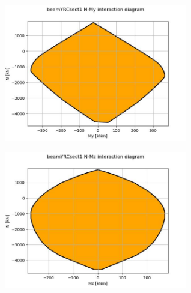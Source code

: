 
\begin{center}
\includegraphics[width=80mm]{results/graphics/sections/beamYRCsect1NMy}
\end{center}
\begin{center}
\includegraphics[width=80mm]{results/graphics/sections/beamYRCsect1NMz}
\end{center}
